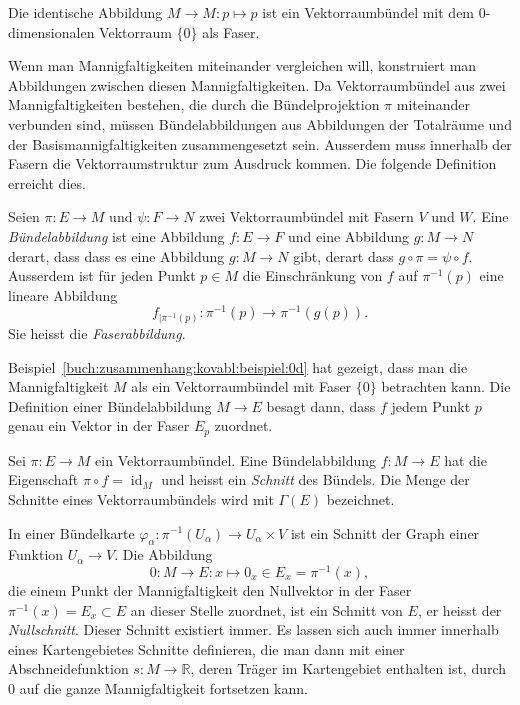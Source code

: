 \begin{beispiel}
\label{buch:zusammenhang:kovabl:beispiel:0d}
Die identische Abbildung $M\to M:p\mapsto p$ ist ein Vektorraumbündel
mit dem 0-dimensionalen Vektorraum $\{0\}$ als Faser.
\end{beispiel}

Wenn man Mannigfaltigkeiten miteinander vergleichen will, konstruiert
man Abbildungen zwischen diesen Mannigfaltigkeiten.
Da Vektorraumbündel aus zwei Mannigfaltigkeiten bestehen, die durch
die Bündelprojektion $\pi$ miteinander verbunden sind, müssen
Bündelabbildungen aus Abbildungen der Totalräume und der
Basismannigfaltigkeiten zusammengesetzt sein.
Ausserdem muss innerhalb der Fasern die Vektorraumstruktur zum
Ausdruck kommen.
Die folgende Definition erreicht dies.

\begin{definition}[Bündelabbildung]
Seien $\pi\colon E \to M$ und $\psi\colon F\to N$ zwei Vektorraumbündel
mit Fasern $V$ und $W$.
Eine \emph{Bündelabbildung} ist eine Abbildung $f\colon E\to F$ und
eine Abbildung $g\colon M\to N$ derart, dass
dass es eine Abbildung $g\colon M\to N$ gibt, derart dass 
$g\circ\pi=\psi\circ f$.
Ausserdem ist für jeden Punkt $p\in M$ die Einschränkung von $f$ auf
$\pi^{-1}(p)$ eine lineare Abbildung
\[
f_{|\pi^{-1}(p)}
\colon
\pi^{-1}(p)
\to
\pi^{-1}(g(p)).
\]
Sie heisst die \emph{Faserabbildung}.
\end{definition}

\begin{beispiel}
Beispiel~\ref{buch:zusammenhang:kovabl:beispiel:0d} hat gezeigt, dass
man die Mannigfaltigkeit $M$ als ein Vektorraumbündel mit Faser $\{0\}$
betrachten kann.
Die Definition einer Bündelabbildung $M\to E$ besagt dann, dass 
$f$ jedem Punkt $p$ genau ein Vektor in der Faser $E_p$ zuordnet.
\end{beispiel}

\begin{definition}
Sei $\pi\colon E\to M$ ein Vektorraumbündel.
Eine Bündelabbildung $f\colon M\to E$ hat die Eigenschaft
$\pi\circ f=\operatorname{id}_M$ und heisst ein \emph{Schnitt}
des Bündels.
Die Menge der Schnitte eines Vektorraumbündels wird mit $\Gamma(E)$
bezeichnet.
\end{definition}

In einer Bündelkarte $\varphi_\alpha:\pi^{-1}(U_\alpha) \to U_\alpha\times V$
ist ein Schnitt der Graph einer Funktion $U_\alpha\to V$.
Die Abbildung
\[
0
\colon
M\to E
:
x \mapsto 0_x\in E_x=\pi^{-1}(x),
\]
die einem Punkt der Mannigfaltigkeit den Nullvektor in der Faser
$\pi^{-1}(x)=E_x \subset E$
an dieser Stelle zuordnet, ist ein Schnitt von $E$, er heisst
der \emph{Nullschnitt}.
%
Dieser Schnitt existiert immer.
Es lassen sich auch immer innerhalb eines Kartengebietes 
Schnitte definieren, die man dann mit einer Abschneidefunktion
$s\colon M\to\mathbb{R}$, deren Träger im Kartengebiet enthalten ist,
durch $0$ auf die ganze Mannigfaltigkeit fortsetzen kann.

